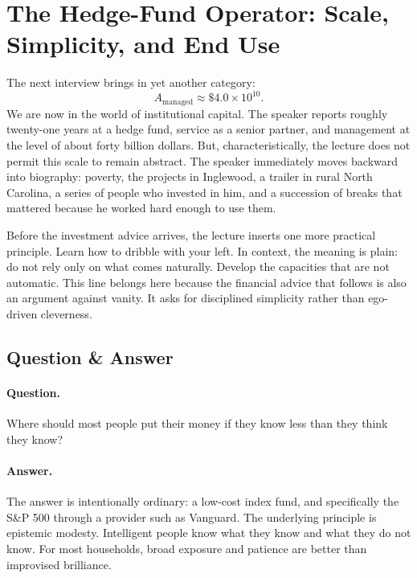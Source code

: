 \section{The Hedge-Fund Operator: Scale, Simplicity, and End Use}

The next interview brings in yet another category:
\begin{equation}
A_{\text{managed}} \approx \$4.0 \times 10^{10}.
\end{equation}
We are now in the world of institutional capital. The speaker reports roughly twenty-one years at a hedge fund, service as a senior partner, and management at the level of about forty billion dollars. But, characteristically, the lecture does not permit this scale to remain abstract. The speaker immediately moves backward into biography: poverty, the projects in Inglewood, a trailer in rural North Carolina, a series of people who invested in him, and a succession of breaks that mattered because he worked hard enough to use them.

Before the investment advice arrives, the lecture inserts one more practical principle. Learn how to dribble with your left. In context, the meaning is plain: do not rely only on what comes naturally. Develop the capacities that are not automatic. This line belongs here because the financial advice that follows is also an argument against vanity. It asks for disciplined simplicity rather than ego-driven cleverness.

\subsection{Question \& Answer}

\paragraph{Question.} Where should most people put their money if they know less than they think they know?

\paragraph{Answer.} The answer is intentionally ordinary: a low-cost index fund, and specifically the S\&P 500 through a provider such as Vanguard. The underlying principle is epistemic modesty. Intelligent people know what they know and what they do not know. For most households, broad exposure and patience are better than improvised brilliance.

